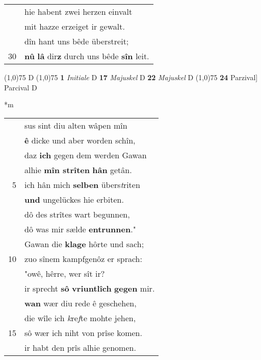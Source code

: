 \documentclass[8pt,a4paper,notitlepage]{article}
\begin{document}
\begin{table}[ht]
\begin{minipage}[t]{0.5\linewidth}
\begin{tabular}{rl}
 & hie habent zwei herzen einvalt\\ 
 & mit hazze erzeiget ir gewalt.\\ 
 & dîn hant uns bêde überstreit;\\ 
30 & \textbf{nû} \textbf{lâ} dir\textbf{z} durch uns bêde \textbf{sîn} leit.\\ 
\end{tabular}
\scriptsize
\line(1,0){75} \newline
D \newline
\line(1,0){75} \newline
\textbf{1} \textit{Initiale} D  \textbf{17} \textit{Majuskel} D  \textbf{22} \textit{Majuskel} D  \newline
\line(1,0){75} \newline
\textbf{24} Parzival] Parcival D \newline
\end{minipage}
\hspace{0.5cm}
\begin{minipage}[t]{0.5\linewidth}
\small
\begin{center}*m
\end{center}
\begin{tabular}{rl}
 & sus sint diu alten wâpen mîn\\ 
 & \textbf{ê} dicke und aber worden schîn,\\ 
 & daz \textbf{ich} gegen dem werden Gawan\\ 
 & alhie \textbf{mîn strîten} \textbf{hân} getân.\\ 
5 & ich hân mich \textbf{selben} übers\textit{t}riten\\ 
 & \textbf{und} ungelückes hie erbiten.\\ 
 & dô des strîtes wart begunnen,\\ 
 & dô was mir sælde \textbf{entrunnen}."\\ 
 & Gawan die \textbf{klage} hôrte und sach;\\ 
10 & zuo sînem kampfgenôz er sprach:\\ 
 & "owê, hêrre, wer sît ir?\\ 
 & ir sprecht \textbf{sô} \textbf{vriuntlîch} \textbf{gegen} mir.\\ 
 & \textbf{wan} wær diu rede ê geschehen,\\ 
 & die wîle ich \textit{k}re\textit{f}te mohte jehen,\\ 
15 & sô wær ich niht von prîse komen.\\ 
 & ir habt den prîs alhie genomen.\\ 

\end{tabular}
\end{minipage}
\end{table}
\end{document}
